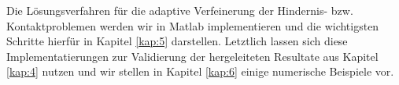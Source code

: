 Die Lösungsverfahren für die adaptive Verfeinerung der Hindernis- bzw. Kontaktproblemen werden wir in Matlab implementieren und die wichtigsten Schritte hierfür in Kapitel \ref{kap:5} darstellen. Letztlich lassen sich diese Implementatierungen zur Validierung der hergeleiteten Resultate aus Kapitel \ref{kap:4} nutzen und wir stellen in Kapitel \ref{kap:6} einige numerische Beispiele vor.
%
%
